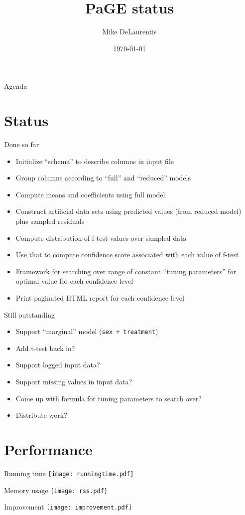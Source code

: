 \documentclass{beamer}
\title[PaGE status]{PaGE status}
\author{Mike DeLaurentis}
\institute{University of Pennsylvania}
\date{\today}
\begin{document}
\begin{frame}
\titlepage
\end{frame}

\begin{frame}{Agenda}
  \tableofcontents
\end{frame}

\section{Status}

\begin{frame}{Done so far}
  \begin{itemize}
  \item Initialize ``schema'' to describe columns in input file
  \item Group columns according to ``full'' and ``reduced'' models
  \item Compute means and coefficients using full model
  \item Construct artificial data sets using predicted values (from
    reduced model) plus sampled residuals
  \item Compute distribution of f-test values over sampled data
  \item Use that to compute confidence score associated with each value of f-test
  \item Framework for searching over range of constant ``tuning parameters''
    for optimal value for each confidence level
  \item Print paginated HTML report for each confidence level
  \end{itemize}
\end{frame}

\begin{frame}{Still outstanding}
  \begin{itemize}
  \item Support ``marginal'' model ({\tt sex + treatment})
  \item Add t-test back in?
  \item Support logged input data?
  \item Support missing values in input data?
  \item Come up with formula for tuning parameters to search over?
  \item Distribute work?
  \end{itemize}
\end{frame}

\section{Performance}

\begin{frame}{Running time}
  \texttt{[image: runningtime.pdf]}
\end{frame}

\begin{frame}{Memory usage}
  \texttt{[image: rss.pdf]}
\end{frame}

\begin{frame}{Improvement}
  \texttt{[image: improvement.pdf]}
\end{frame}
\end{document}
